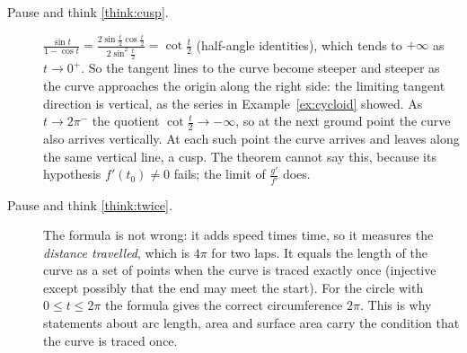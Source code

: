 \documentclass[11pt]{article}
\begin{document}
\begin{description}
  \item[Pause and think \ref{think:cusp}.] $\frac{\sin t}{1-\cos t}=\frac{2\sin\frac t2\cos\frac t2}{2\sin^2\frac t2}=\cot\frac t2$ (half-angle identities), which tends to $+\infty$ as $t\to0^+$. So the tangent lines to the curve become steeper and steeper as the curve approaches the origin along the right side: the limiting tangent direction is vertical, as the series in Example~\ref{ex:cycloid} showed. As $t\to2\pi^-$ the quotient $\cot\frac t2\to-\infty$, so at the next ground point the curve also arrives vertically. At each such point the curve arrives and leaves along the same vertical line, a cusp. The theorem cannot say this, because its hypothesis $f'(t_0)\ne0$ fails; the limit of $\frac{g'}{f'}$ does.
  \item[Pause and think \ref{think:twice}.] The formula is not wrong: it adds speed times time, so it measures the \emph{distance travelled}, which is $4\pi$ for two laps. It equals the length of the curve as a set of points when the curve is traced exactly once (injective except possibly that the end may meet the start). For the circle with $0\le t\le2\pi$ the formula gives the correct circumference $2\pi$. This is why statements about arc length, area and surface area carry the condition that the curve is traced once.
\end{description}
\end{document}
